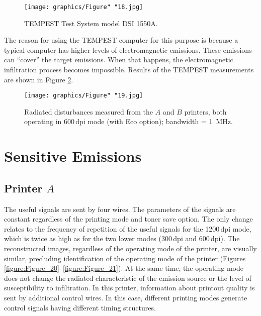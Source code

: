 \documentclass[letterpaper,journal]{ieeetran}
\begin{document}
\begin{figure}[ht]
    \centering
    \texttt{[image: graphics/Figure" "18.jpg]}
    \caption{TEMPEST Test System model DSI 1550A.}
    \label{figure:Figure_18}
\end{figure}

The reason for using the TEMPEST computer for this purpose is because a
typical computer has higher levels of electromagnetic emissions. These
emissions can ``cover'' the target
emissions. When that happens, the electromagnetic infiltration process
becomes impossible. Results of the TEMPEST measurements are shown in Figure
\ref{figure:Figure_19}.

\begin{figure}[ht]
    \centering
    \texttt{[image: graphics/Figure" "19.jpg]}
    \caption{Radiated disturbances measured from the $A$ and $B$ printers,
        both operating in 600\,dpi mode (with Eco option); bandwidth =
        \SI{1}{\mega\hertz}.}
    \label{figure:Figure_19}
\end{figure}

\section{Sensitive Emissions}

\subsection{Printer $A$}

The useful signals are sent by four wires. The parameters of the signals are
constant regardless of the printing mode and toner save option. The only
change relates to the frequency of repetition of the useful signals for the
1200\,dpi mode, which is twice as high as for the two lower modes (300\,dpi
and 600\,dpi). The reconstructed images, regardless of the operating mode of
the printer, are visually similar, precluding identification of the operating
mode of the printer (Figures \ref{figure:Figure_20}--\ref{figure:Figure_21}).
At the same time, the operating mode does not change the radiated
characteristic of the emission source or the level of susceptibility to
infiltration. In this printer, information about printout quality is sent by
additional control wires. In this case, different printing modes generate
control signals having different timing structures.
\end{document}
